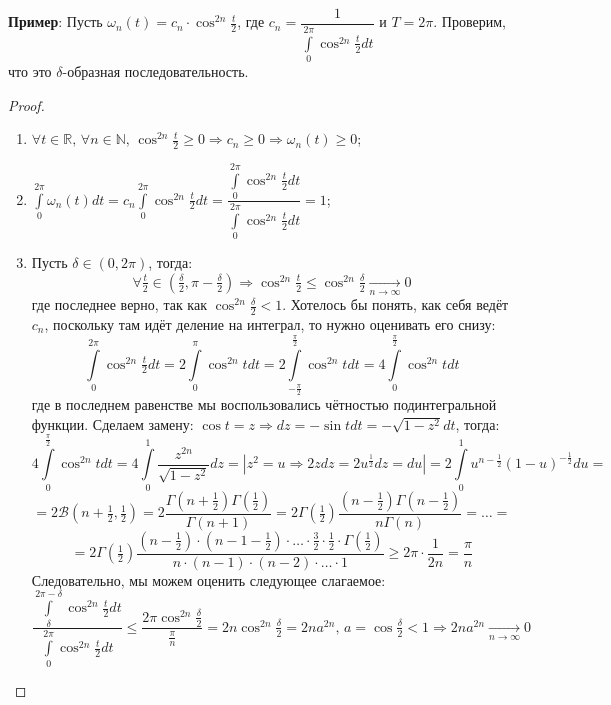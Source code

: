 \documentclass[12pt]{article}
\newcommand{\MR}{\mathbb{R}}
\newcommand{\MN}{\mathbb{N}}
\newcommand{\MB}{\mathcal{B}}
\theoremstyle{definition}
\newcommand{\ddint}[2]{\displaystyle\int\limits_{#1}^{#2}}
\begin{document}
\textbf{Пример}: Пусть $\omega_n(t) = c_n{\cdot}\cos^{2n}{\tfrac{t}{2}}$, где $c_n = \dfrac{1}{\int\limits_{0}^{2\pi}\cos^{2n}{\tfrac{t}{2}}dt}$ и $T = 2\pi$. Проверим, что это $\delta$-образная последовательность. 
\begin{proof}\hfill
	\begin{enumerate}[label=\arabic*)]
		\item $\forall t \in \MR, \, \forall n \in \MN, \, \cos^{2n}{\tfrac{t}{2}} \geq 0 \Rightarrow c_n \geq 0 \Rightarrow \omega_n(t) \geq 0$;
		\item $\ddint{0}{2\pi}\omega_n(t)dt = c_n\ddint{0}{2\pi}\cos^{2n}{\tfrac{t}{2}}dt = \dfrac{\int\limits_{0}^{2\pi}\cos^{2n}{\tfrac{t}{2}}dt}{\int\limits_{0}^{2\pi}\cos^{2n}{\tfrac{t}{2}}dt} = 1$;
		\item Пусть $\delta \in (0, 2\pi)$, тогда: 
		$$
			\forall \tfrac{t}{2} \in \left(\tfrac{\delta}{2}, \pi - \tfrac{\delta}{2}\right) \Rightarrow \cos^{2n}{\tfrac{t}{2}} \leq \cos^{2n}{\tfrac{\delta}{2}} \xrightarrow[n\to\infty]{} 0
		$$ 
		где последнее верно, так как $\cos^{2n}{\tfrac{\delta}{2}} < 1$. Хотелось бы понять, как себя ведёт $c_n$, поскольку там идёт деление на интеграл, то нужно оценивать его снизу:
		$$
			\ddint{0}{2\pi}\cos^{2n}{\tfrac{t}{2}}dt = 2\ddint{0}{\pi}\cos^{2n}tdt = 2\ddint{-\frac{\pi}{2}}{\frac{\pi}{2}}\cos^{2n}tdt = 4 \ddint{0}{\frac{\pi}{2}}\cos^{2n}tdt
		$$
		где в последнем равенстве мы воспользовались чётностью подинтегральной функции. Сделаем замену: $\cos{t} = z \Rightarrow dz = -\sin{t}dt = -\sqrt{1- z^2}dt$, тогда:
		$$
			4 \ddint{0}{\frac{\pi}{2}}\cos^{2n}tdt = 4 \ddint{0}{1}\dfrac{z^{2n}}{\sqrt{1 - z^2}}dz = |z^2 = u \Rightarrow 2zdz = 2u^{\frac{1}{2}}dz = du| = 2\ddint{0}{1}u^{n -\frac{1}{2}}(1-u)^{-\frac{1}{2}}du = 
		$$
		$$
			= 2\MB\left(n + \tfrac{1}{2}, \tfrac{1}{2}\right) = 2\dfrac{\Gamma\left(n + \frac{1}{2}\right)\Gamma\left(\frac{1}{2}\right)}{\Gamma(n+1)} = 2\Gamma\left(\tfrac{1}{2}\right)\dfrac{\left(n - \frac{1}{2}\right)\Gamma\left(n - \frac{1}{2}\right)}{n\Gamma(n)} = \dotsc =
		$$
		$$
			= 2\Gamma\left(\tfrac{1}{2}\right)\dfrac{\left(n - \frac{1}{2}\right){\cdot}\left(n - 1- \frac{1}{2}\right){\cdot}\dotsc{\cdot}\tfrac{3}{2}{\cdot}\tfrac{1}{2}{\cdot}\Gamma\left(\tfrac{1}{2}\right)}{n{\cdot}(n-1){\cdot}(n-2){\cdot}\dotsc{\cdot}1} \geq 2 \pi{\cdot}\dfrac{1}{2n} = \dfrac{\pi}{n}
		$$
		Следовательно, мы можем оценить следующее слагаемое:
		$$
			\dfrac{\int\limits_{\delta}^{2\pi - \delta}\cos^{2n}{\tfrac{t}{2}}dt}{\int\limits_{0}^{2\pi}\cos^{2n}{\tfrac{t}{2}}dt} \leq \dfrac{2\pi \cos^{2n}{\tfrac{\delta}{2}}}{\tfrac{\pi}{n}} = 2n\cos^{2n}{\tfrac{\delta}{2}} = 2n a^{2n}, \, a = \cos{\tfrac{\delta}{2}} < 1 \Rightarrow  2n a^{2n} \xrightarrow[n \to \infty]{} 0
		$$
	\end{enumerate}
\end{proof}
\end{document}
